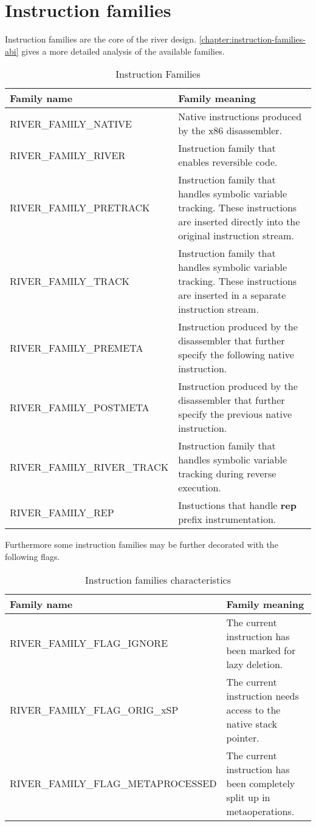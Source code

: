 \documentclass[12pt]{report}
\begin{document}
\section{Instruction families}
\label{sec:instrfamilies}
Instruction families are the core of the river design. \autoref{chapter:instruction-families-abi} gives a more detailed analysis of the available families.\\
\begin{table}[H]
	\begin{tabular}{| p{6cm} | p{10cm} |}
		\hline
		\textbf{Family name} & \textbf{Family meaning}\\ \hline
		RIVER_FAMILY_NATIVE & Native instructions produced by the x86 disassembler.\\ \hline
		RIVER_FAMILY_RIVER & Instruction family that enables reversible code.\\ \hline
		RIVER_FAMILY_PRETRACK & Instruction family that handles symbolic variable tracking. These instructions are inserted directly into the original instruction stream.\\ \hline
		RIVER_FAMILY_TRACK & Instruction family that handles symbolic variable tracking. These instructions are inserted in a separate instruction stream.\\ \hline
		RIVER_FAMILY_PREMETA & Instruction produced by the disassembler that further specify the following native instruction.\\ \hline
		RIVER_FAMILY_POSTMETA & Instruction produced by the disassembler that further specify the previous native instruction.\\ \hline
		RIVER_FAMILY_RIVER_TRACK & Instruction family that handles symbolic variable tracking during reverse execution.\\ \hline
		RIVER_FAMILY_REP & Instuctions that handle \textbf{rep} prefix instrumentation.\\ \hline
	\end{tabular}
	\caption{Instruction Families}
	\label{table:instruction-families}
\end{table}
Furthermore some instruction families may be further decorated with the following flags.\\
\begin{table}[H]
	\begin{tabular}{| p{8cm} | p{8cm} |}
		\hline
		\textbf{Family name} & \textbf{Family meaning}\\ \hline
		RIVER_FAMILY_FLAG_IGNORE & The current instruction has been marked for lazy deletion.\\ \hline
		RIVER_FAMILY_FLAG_ORIG_xSP & The current instruction needs access to the native stack pointer.\\ \hline
		RIVER_FAMILY_FLAG_METAPROCESSED & The current instruction has been completely split up in metaoperations.\\ \hline
	\end{tabular}
	\caption{Instruction families characteristics}
\end{table}
\end{document}
